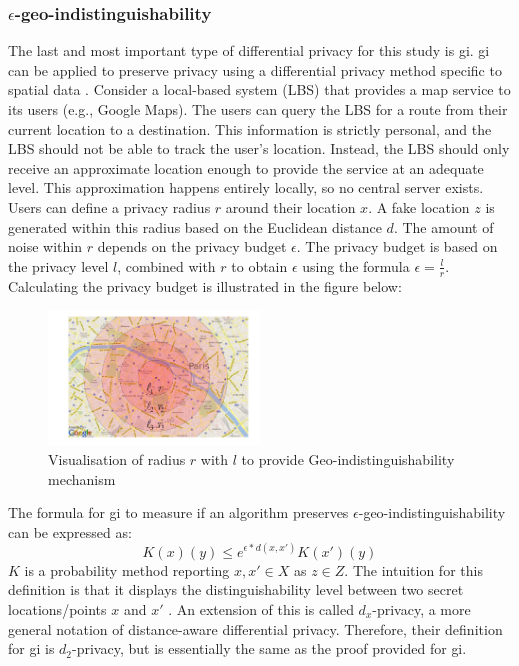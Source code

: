 \subsubsection{$\epsilon$-geo-indistinguishability}
The last and most important type of differential privacy for this study is \gls{gi}.
\gls{gi} can be applied to preserve privacy using a differential privacy method specific to spatial data \citep{DBLP:journals/corr/abs-1212-1984}.
Consider a local-based system (LBS) that provides a map service to its users (e.g., Google Maps).
The users can query the LBS for a route from their current location to a destination.
This information is strictly personal, and the LBS should not be able to track the user's location.
Instead, the LBS should only receive an approximate location enough to provide the service at an adequate level.
This approximation happens entirely locally, so no central server exists.
\newpage
Users can define a privacy radius $r$ around their location $x$.
A fake location $z$ is generated within this radius based on the Euclidean distance $d$. \newline
The amount of noise within $r$ depends on the privacy budget $\epsilon$.
The privacy budget is based on the privacy level $l$, combined with $r$ to obtain $\epsilon$ using the formula $\epsilon = \frac{l}{r}$. \newline
Calculating the privacy budget is illustrated in the figure below:
\begin{figure}[H]
  \includegraphics[width=0.5\textwidth]{TheorethicalFramework/geo-indistinguishability.png}
  \caption{Visualisation of radius $r$ with $l$ to provide Geo-indistinguishability mechanism \citep{DBLP:journals/corr/abs-1212-1984}}
  \label{fig:geo-indistinguishability}
\end{figure}

The formula for \gls{gi} to measure if an algorithm preserves $\epsilon$-geo-indistinguishability can be expressed as:
\begin{equation}
  K(x)(y) \le e^{\epsilon * d(x,x')} K(x')(y)
  \label{algo:2d-geo-indistinguishability}
\end{equation}
$K$ is a probability method reporting $x, x' \in X$ as $z \in Z$.
The intuition for this definition is that it displays the distinguishability level between two secret locations/points $x$ and $x'$ \citep{chatzikokolakis_constructing_2015}.
An extension of this is called $d_x$-privacy, a more general notation of distance-aware differential privacy.
Therefore, their definition for \gls{gi} is $d_2$-privacy, but is essentially the same as the proof provided for \gls{gi}.
\newpage

